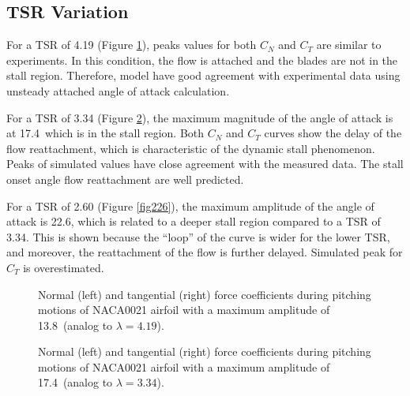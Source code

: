 \documentclass[a4paper]{jpconf}
\begin{document}
\subsection{TSR Variation}

For a TSR of 4.19 (Figure \ref{fig138}), peaks values for both $C_N$ and $C_T$
are similar to experiments. In this condition, the flow is attached and the
blades are not in the stall region. Therefore, model have good agreement with
experimental data using unsteady attached angle of attack calculation.

For a TSR of 3.34 (Figure \ref{fig174}), the maximum magnitude of the angle of
attack is at 17.4\degree\ which is in the stall region. Both $C_N$ and $C_T$
curves show the delay of the flow reattachment, which is characteristic of the
dynamic stall phenomenon. Peaks of simulated values have close agreement with
the measured data. The stall onset angle flow reattachment are well predicted.

For a TSR of 2.60 (Figure \ref{fig226}), the maximum amplitude of the angle of
attack is 22.6\degree, which is related to a deeper stall region compared to a
TSR of 3.34. This is shown because the ``loop'' of the curve is wider for the
lower TSR, and moreover, the reattachment of the flow is further delayed.
Simulated peak for $C_T$ is overestimated.

\begin{figure}[h]
\begin{minipage}{18pc}
\resizebox{\columnwidth}{!}{}
\end{minipage}\hspace{2pc}%
\begin{minipage}{18pc}
\resizebox{\columnwidth}{!}{}
\end{minipage}
\caption{\label{fig138}Normal (left) and tangential (right) force coefficients during pitching motions of NACA0021 airfoil with a maximum amplitude of 13.8\degree\ (analog to $\lambda = 4.19$).}
\end{figure}


\begin{figure}[h]
\begin{minipage}{18pc}
\resizebox{\columnwidth}{!}{}
\end{minipage}\hspace{2pc}%
\begin{minipage}{18pc}
\resizebox{\columnwidth}{!}{}
\end{minipage}
\caption{\label{fig174}Normal (left) and tangential (right) force coefficients during pitching motions of NACA0021 airfoil with a maximum amplitude of 17.4\degree\ (analog to $\lambda = 3.34$).}
\end{figure}
\end{document}
